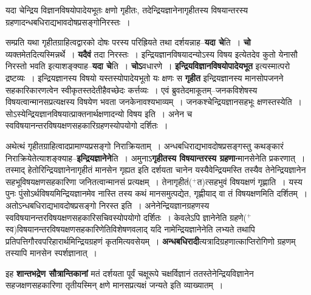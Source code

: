 \documentclass[article,12pt,a4paper]{memoir}
\newcommand{\add}[1]{($^{+}$#1)}
\begin{document}
	  \pstart यदा चेन्द्रिय विज्ञानविषयोपादेयभूतः क्षणो गृहीतः, तदेन्द्रियज्ञानेनागृहीतस्य विषयान्तरस्य ग्रहणादन्धबधिराद्यभावदोषप्रसङ्गोनिरस्तः ।
	\pend
      
	  \endgroup
	

	  \pstart सम्प्रति यथा गृहीतग्राहित्वद्वारको दोषः परस्य परिह्रियते तथा दर्शयन्नाह--\textbf{यदा चे}ति । \textbf{चो} व्यक्तमेतदित्यस्मिन्नर्थे । \textbf{यदैवं} तदा निरस्तः । इन्द्रियज्ञानविषयादन्योऽस्य विषय इत्येतदेव कुतो येनासौ निरस्तो भवति इत्याशङ्क्याह--\textbf{यदा चे}ति । \textbf{चोऽ}वधारणे । \textbf{इन्द्रियविज्ञानविषयोपादेयभूत} इत्यस्मात्परो द्रष्टव्यः । इन्द्रियज्ञानस्य विषयो यस्तस्योपादेयभूतो यः क्षणः स \textbf{गृहीत} इन्द्रियज्ञानस्य मानसोपजनने सहकारिकारणत्वेन स्वीकृतस्तदेतीहैवच्छेदः कर्त्तव्यः । एवं ब्रुवतेदमाकूतम्--जनकविशेषस्य विषयत्वान्मानसप्रत्यक्षस्य विषयेण भवता जनकेनावश्यभाव्यम् । जनकश्चेन्द्रियज्ञानसहभूः क्षणस्तस्येति । सोऽस्येन्द्रियज्ञानविषयात्प्राक्तनार्थक्षणादन्यो विषय इति । अनेन च स्वविषयानन्तरविषयक्षणसहकारिग्रहणस्योपयोगो दर्शितः ।
	\pend
      

	  \pstart अथेत्थं गृहीतग्राहित्वादप्रामाण्यप्रसङ्गो निराक्रियताम् । अन्धबधिराद्यभावदोषप्रसङ्गस्तु कथङ्कारं निराक्रियेतेत्याशङ्क्याह--\textbf{इन्द्रियज्ञानेने}ति । अमुनाऽ\textbf{गृहीतस्य विषयान्तरस्य ग्रहणा}न्मानसेनेति प्रकरणात् । तस्माद् हेतोरिन्द्रियज्ञानेनागृहीतं मानसेन गृह्यत इति दर्शयता चानेन यस्यैवेन्द्रियमस्ति तस्यैव तेनेन्द्रियज्ञानेन सहभूविषयक्षणसहकारिणा जनितत्वान्मानसं प्रत्यक्षम् । तेनागृहीतं\add{त}त्सहभुवं विषयक्षणं गृह्णाति । यस्य पुनः पुंसोऽर्थविषयमिन्द्रियज्ञानमेव नास्ति तस्य कथं मानसमुत्पद्येत, गृह्णीयाद् वा तं विषयक्षणमिति दर्शितम् । अतोऽन्धबधिराद्यभावदोषप्रसङ्गो निरस्त इति । अनेनेन्द्रियज्ञानग्रहणस्य स्वविषयानन्तरविषयक्षणसहकारिसचिवस्योपयोगो दर्शितः । केवलेऽपि ज्ञानेनेति ग्रहणे\add{स्व}\leavevmode{}विषयानन्तरविषयक्षणसहकारिणेतिविशेषणवलाद् यदि नामेन्द्रियज्ञानेनेति लभ्यते तथापि प्रतिपत्तिगौरवपरिहारार्थमिन्द्रियग्रहणं कृतमित्यवसेयम् । \textbf{अन्धबधिरादी}त्यत्रादिग्रहणात्काप्तिरोगिणो ग्रहणम् तस्यापि मानसेन स्पर्शज्ञानात् ।
	\pend
      

	  \pstart इह \textbf{शान्तभद्रेण सौत्रान्तिकानां} मतं दर्शयता पूर्वं चक्षूरूपे चक्षर्विज्ञानं ततस्तेनेन्द्रियविज्ञानेन सहजक्षणसहकारिणा तृतीयस्मिन् क्षणे मानसप्रत्यक्षं जन्यते इति व्याख्यातम् ।  \leavevmode{} 
	  
\end{document}
